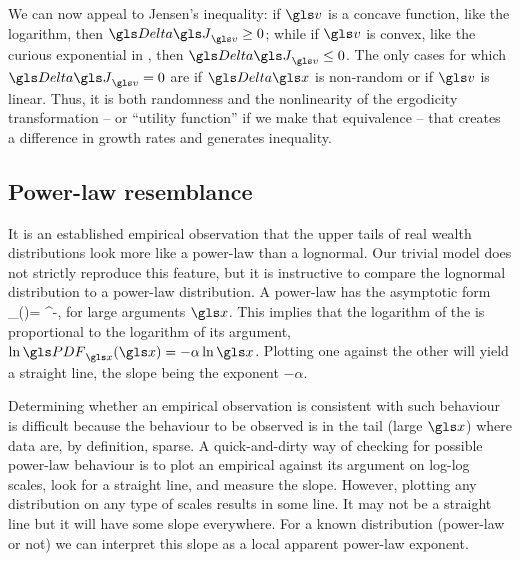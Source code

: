 We can now appeal to Jensen's inequality: if $\gv$ is a concave function, like the logarithm, then $\D \J_\gv \geq 0$; while if $\gv$ is convex, like the curious exponential in , then $\D \J_\gv \leq 0$. The only cases for which $\D \J_\gv=0$ are if $\D \x$ is non-random or if $\gv$ is linear. Thus, it is both randomness and the nonlinearity of the ergodicity transformation -- or ``utility function'' if we make that equivalence -- that creates a difference in growth rates and generates inequality.


\subsection{Power-law resemblance}
It is an established empirical observation \cite{Newman2005} that the upper tails of 
real wealth distributions look more like a power-law than a lognormal. Our trivial model does not
strictly reproduce this feature, but it is instructive to compare the lognormal distribution
to a power-law distribution. A power-law \PDFa has the asymptotic form 
\be
\PDF_\x(\x)= \x^{-\alpha},
\ee
for large arguments $\x$. This implies that the logarithm of the \PDFa is proportional 
to the logarithm of its argument, $\ln \PDF_\x(\x) = -\alpha \ln \x$. Plotting
one against the other will yield a straight line, the slope being the exponent $-\alpha$. 

Determining whether an empirical observation is consistent with such behaviour 
is difficult because the behaviour to be observed is in the tail (large $\x$) where data are,
by definition, sparse. A quick-and-dirty way of checking for possible power-law 
behaviour is to plot an empirical \PDFa against its argument on log-log scales, 
look for a straight line, and measure the slope. However, plotting any distribution on any 
type of scales results in some line. It may not be a straight line but it will have some slope 
everywhere. For a known distribution (power-law or not) we can interpret this slope 
as a local apparent power-law exponent. 

